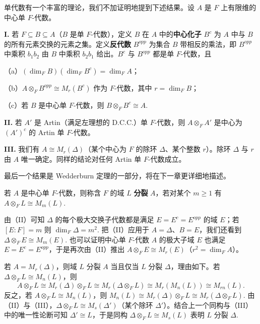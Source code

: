 单代数有一个丰富的理论，我们不加证明地提到下述结果。设 \(A\) 是 \(F\) 上有限维的中心单 \(F\)-代数。

\noindent\textbf{I.} 若 \(F \subseteq B \subseteq A\)（\(B\) 是单 \(F\)-代数），定义 \(B\) 在 \(A\) 中的\textbf{中心化子} \(B^c\) 为 \(A\) 中与 \(B\) 的所有元素交换的元素之集。定义\textbf{反代数} \(B^{opp}\) 为集合 \(B\) 带相反的乘法，即 \(B^{opp}\) 中乘积 \(b_1b_2\) 由 \(B\) 中乘积 \(b_2b_1\) 给出。\(B^c\) 与 \(B^{opp}\) 都是单 \(F\)-代数，且

（a）\((\dim_FB)(\dim_FB^c) = \dim_FA\)；

（b）\(A \otimes_FB^{opp} \cong M_r(B^c)\) 作为 \(F\)-代数，其中 \(r = \dim_FB\)；

（c）若 \(B\) 是中心单 \(F\)-代数，则 \(B \otimes_FB^c \cong A\).

\noindent\textbf{II.} 若 \(A'\) 是 Artin（满足左理想的 D.C.C.）单 \(F\)-代数，则 \(A \otimes_FA'\) 是中心为 \((A')^c\) 的 Artin 单 \(F\)-代数。

\noindent\textbf{III.} 我们有 \(A \cong M_r(\Delta)\)（某个中心为 \(F\) 的除环 \(\Delta\)、某个整数 \(r\)）。除环 \(\Delta\) 与 \(r\) 由 \(A\) 唯一确定。同样的结论对任何 Artin 单 \(F\)-代数成立。

最后一个结果是 Wedderburn 定理的一部分，将在下一章更详细地描述。

\begin{definition}
若 \(A\) 是中心单 \(F\)-代数，则称含 \(F\) 的域 \(L\) \textbf{分裂} \(A\)，若对某个 \(m \geq 1\) 有 \(A \otimes_FL \cong M_m(L)\).
\end{definition}

由（II）可知 \(\Delta\) 的每个极大交换子代数都是满足 \(E = E^c = E^{opp}\) 的域 \(E\)；若 \([E:F] = m\) 则 \(\dim_F\Delta = m^2\). 把（II）应用于 \(A = \Delta\)、\(B = E\)，我们还看到 \(\Delta \otimes_FE \cong M_m(E)\). 也可以证明中心单 \(F\)-代数 \(A\) 的极大子域 \(E\) 也满足 \(E = E^c = E^{opp}\)，于是再次由（II）推出 \(A \otimes_FE \cong M_r(E)\)（\(r^2 = \dim_FA\)）。

若 \(A = M_r(\Delta)\)，则域 \(L\) 分裂 \(A\) 当且仅当 \(L\) 分裂 \(\Delta\)，理由如下。若 \(\Delta \otimes_FL \cong M_n(L)\)，则
\[
A \otimes_FL \cong M_r(\Delta)\otimes_FL \cong M_r(\Delta \otimes_FL) \cong M_r(M_n(L)) \cong M_{rn}(L).
\]
反之，若 \(A \otimes_FL \cong M_n(L)\)，则 \(M_n(L) \cong M_r(\Delta)\otimes_FL \cong M_r(\Delta \otimes_FL)\). 由（II）与（III），\(\Delta \otimes_FL \cong M_s(\Delta')\)（某个除环 \(\Delta'\)）。结合上一个同构与（III）中的唯一性论断可知 \(\Delta' \cong L\)，于是同构 \(\Delta \otimes_FL \cong M_s(L)\) 表明 \(L\) 分裂 \(\Delta\).

